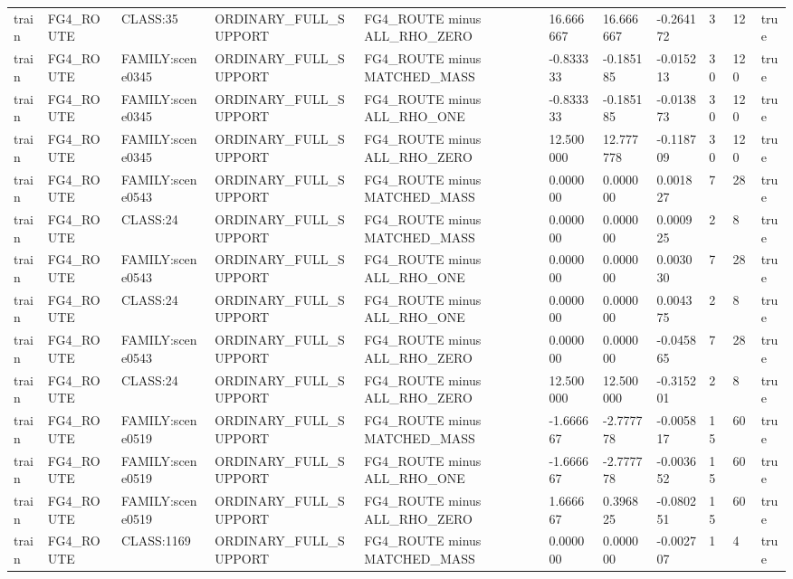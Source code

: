 \begin{tabular}{lllllllllll}
train & FG4\_ROUTE & CLASS:35 & ORDINARY\_FULL\_SUPPORT & FG4\_ROUTE minus ALL\_RHO\_ZERO & 16.666667 & 16.666667 & -0.264172 & 3 & 12 & true \\
train & FG4\_ROUTE & FAMILY:scene0345 & ORDINARY\_FULL\_SUPPORT & FG4\_ROUTE minus MATCHED\_MASS & -0.833333 & -0.185185 & -0.015213 & 30 & 120 & true \\
train & FG4\_ROUTE & FAMILY:scene0345 & ORDINARY\_FULL\_SUPPORT & FG4\_ROUTE minus ALL\_RHO\_ONE & -0.833333 & -0.185185 & -0.013873 & 30 & 120 & true \\
train & FG4\_ROUTE & FAMILY:scene0345 & ORDINARY\_FULL\_SUPPORT & FG4\_ROUTE minus ALL\_RHO\_ZERO & 12.500000 & 12.777778 & -0.118709 & 30 & 120 & true \\
train & FG4\_ROUTE & FAMILY:scene0543 & ORDINARY\_FULL\_SUPPORT & FG4\_ROUTE minus MATCHED\_MASS & 0.000000 & 0.000000 & 0.001827 & 7 & 28 & true \\
train & FG4\_ROUTE & CLASS:24 & ORDINARY\_FULL\_SUPPORT & FG4\_ROUTE minus MATCHED\_MASS & 0.000000 & 0.000000 & 0.000925 & 2 & 8 & true \\
train & FG4\_ROUTE & FAMILY:scene0543 & ORDINARY\_FULL\_SUPPORT & FG4\_ROUTE minus ALL\_RHO\_ONE & 0.000000 & 0.000000 & 0.003030 & 7 & 28 & true \\
train & FG4\_ROUTE & CLASS:24 & ORDINARY\_FULL\_SUPPORT & FG4\_ROUTE minus ALL\_RHO\_ONE & 0.000000 & 0.000000 & 0.004375 & 2 & 8 & true \\
train & FG4\_ROUTE & FAMILY:scene0543 & ORDINARY\_FULL\_SUPPORT & FG4\_ROUTE minus ALL\_RHO\_ZERO & 0.000000 & 0.000000 & -0.045865 & 7 & 28 & true \\
train & FG4\_ROUTE & CLASS:24 & ORDINARY\_FULL\_SUPPORT & FG4\_ROUTE minus ALL\_RHO\_ZERO & 12.500000 & 12.500000 & -0.315201 & 2 & 8 & true \\
train & FG4\_ROUTE & FAMILY:scene0519 & ORDINARY\_FULL\_SUPPORT & FG4\_ROUTE minus MATCHED\_MASS & -1.666667 & -2.777778 & -0.005817 & 15 & 60 & true \\
train & FG4\_ROUTE & FAMILY:scene0519 & ORDINARY\_FULL\_SUPPORT & FG4\_ROUTE minus ALL\_RHO\_ONE & -1.666667 & -2.777778 & -0.003652 & 15 & 60 & true \\
train & FG4\_ROUTE & FAMILY:scene0519 & ORDINARY\_FULL\_SUPPORT & FG4\_ROUTE minus ALL\_RHO\_ZERO & 1.666667 & 0.396825 & -0.080251 & 15 & 60 & true \\
train & FG4\_ROUTE & CLASS:1169 & ORDINARY\_FULL\_SUPPORT & FG4\_ROUTE minus MATCHED\_MASS & 0.000000 & 0.000000 & -0.002707 & 1 & 4 & true \\

\end{tabular}
